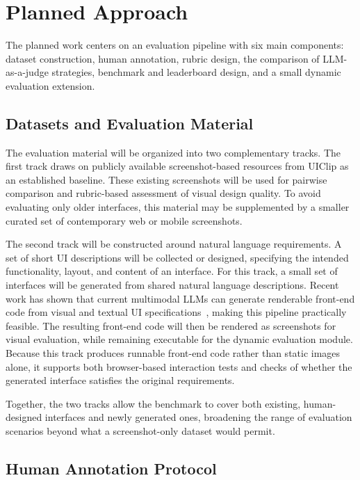 \documentclass[pdflatex,sn-mathphys-num]{sn-jnl}
\begin{document}
\section{Planned Approach}\label{sec:approach}

The planned work centers on an evaluation pipeline with six main components: dataset
construction, human annotation, rubric design, the comparison of LLM-as-a-judge
strategies, benchmark and leaderboard design, and a small dynamic evaluation
extension.

\subsection{Datasets and Evaluation Material}

The evaluation material will be organized into two complementary tracks. The first
track draws on publicly available screenshot-based resources from UIClip as an
established baseline. These existing screenshots will be used for pairwise comparison
and rubric-based assessment of visual design quality. To avoid evaluating only older
interfaces, this material may be supplemented by a smaller curated set of contemporary
web or mobile screenshots.

The second track will be constructed around natural language requirements. A set of
short UI descriptions will be collected or designed, specifying the intended
functionality, layout, and content of an interface. For this track, a small set of
interfaces will be generated from shared natural language descriptions. Recent work
has shown that current multimodal LLMs can generate renderable front-end code from
visual and textual UI specifications~\cite{design2code}, making this pipeline
practically feasible. The resulting front-end code will then be rendered as screenshots
for visual evaluation, while remaining executable for the dynamic evaluation module.
Because this track produces runnable front-end code rather than static images alone,
it supports both browser-based interaction tests and checks of whether the generated
interface satisfies the original requirements.

Together, the two tracks allow the benchmark to cover both existing, human-designed
interfaces and newly generated ones, broadening the range of evaluation scenarios
beyond what a screenshot-only dataset would permit.

\subsection{Human Annotation Protocol}
\end{document}
